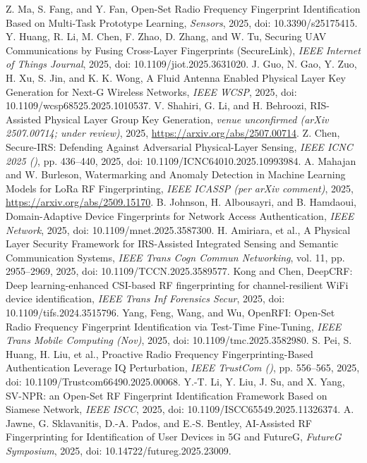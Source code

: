 Z. Ma, S. Fang, and Y. Fan, Open-Set Radio Frequency Fingerprint Identification Based on Multi-Task Prototype Learning, \emph{Sensors}, 2025, doi: 10.3390/s25175415.
Y. Huang, R. Li, M. Chen, F. Zhao, D. Zhang, and W. Tu, Securing UAV Communications by Fusing Cross-Layer Fingerprints (SecureLink), \emph{IEEE Internet of Things Journal}, 2025, doi: 10.1109/jiot.2025.3631020.
J. Guo, N. Gao, Y. Zuo, H. Xu, S. Jin, and K. K. Wong, A Fluid Antenna Enabled Physical Layer Key Generation for Next-G Wireless Networks, \emph{IEEE WCSP}, 2025, doi: 10.1109/wcsp68525.2025.1010537.
V. Shahiri, G. Li, and H. Behroozi, RIS-Assisted Physical Layer Group Key Generation, \emph{venue unconfirmed (arXiv 2507.00714; under review)}, 2025, \url{https://arxiv.org/abs/2507.00714}.
Z. Chen, Secure-IRS: Defending Against Adversarial Physical-Layer Sensing, \emph{IEEE ICNC 2025 ()}, pp. 436--440, 2025, doi: 10.1109/ICNC64010.2025.10993984.
A. Mahajan and W. Burleson, Watermarking and Anomaly Detection in Machine Learning Models for LoRa RF Fingerprinting, \emph{IEEE ICASSP (per arXiv comment)}, 2025, \url{https://arxiv.org/abs/2509.15170}.
B. Johnson, H. Albousayri, and B. Hamdaoui, Domain-Adaptive Device Fingerprints for Network Access Authentication, \emph{IEEE Network}, 2025, doi: 10.1109/mnet.2025.3587300.
H. Amiriara, et al., A Physical Layer Security Framework for IRS-Assisted Integrated Sensing and Semantic Communication Systems, \emph{IEEE Trans Cogn Commun Networking}, vol. 11, pp. 2955--2969, 2025, doi: 10.1109/TCCN.2025.3589577.
Kong and Chen, DeepCRF: Deep learning-enhanced CSI-based RF fingerprinting for channel-resilient WiFi device identification, \emph{IEEE Trans Inf Forensics Secur}, 2025, doi: 10.1109/tifs.2024.3515796.
Yang, Feng, Wang, and Wu, OpenRFI: Open-Set Radio Frequency Fingerprint Identification via Test-Time Fine-Tuning, \emph{IEEE Trans Mobile Computing (Nov)}, 2025, doi: 10.1109/tmc.2025.3582980.
S. Pei, S. Huang, H. Liu, et al., Proactive Radio Frequency Fingerprinting-Based Authentication Leverage IQ Perturbation, \emph{IEEE TrustCom ()}, pp. 556--565, 2025, doi: 10.1109/Trustcom66490.2025.00068.
Y.-T. Li, Y. Liu, J. Su, and X. Yang, SV-NPR: an Open-Set RF Fingerprint Identification Framework Based on Siamese Network, \emph{IEEE ISCC}, 2025, doi: 10.1109/ISCC65549.2025.11326374.
A. Jawne, G. Sklavanitis, D.-A. Pados, and E.-S. Bentley, AI-Assisted RF Fingerprinting for Identification of User Devices in 5G and FutureG, \emph{FutureG Symposium}, 2025, doi: 10.14722/futureg.2025.23009.
